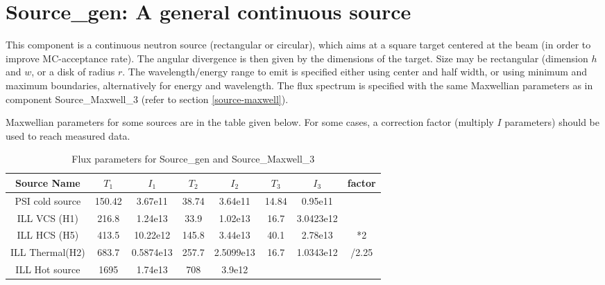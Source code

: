 \section{Source\_gen: A general continuous source}
\label{source-gen}


This component is a continuous neutron source (rectangular or circular), which aims at
a square target centered at the beam (in order to improve MC-acceptance
rate). The angular divergence is then given by the dimensions of the
target. Size may be rectangular (dimension $h$ and $w$, or a disk of radius $r$. The wavelength/energy range to emit is specified either using center and half width, or using minimum and maximum boundaries, alternatively for energy and wavelength.
The flux spectrum is specified with the same Maxwellian parameters as in component Source\_Maxwell\_3 (refer to section \ref{source-maxwell}).

Maxwellian parameters for some sources are in the table given below. For some cases, a correction factor (multiply $I$ parameters) should be used to reach measured data.

\begin{table}
  \begin{center}
  {\let\my=\\
    \begin{tabular}{cccccccc}
    \hline
    Source Name & $T_1$ & $I_1$ & $T_2$ & $I_2$ & $T_3$ & $I_3$ & factor \\
    \hline
    PSI cold source & 150.42 & 3.67e11   & 38.74 & 3.64e11    & 14.84& 0.95e11    &\\
    ILL VCS (H1)    & 216.8  & 1.24e13  & 33.9  & 1.02e13   & 16.7 & 3.0423e12 &\\
    ILL HCS (H5)    & 413.5  & 10.22e12  & 145.8 & 3.44e13    & 40.1 & 2.78e13    & *2\\
    ILL Thermal(H2) & 683.7  & 0.5874e13& 257.7 & 2.5099e13 & 16.7 & 1.0343e12 & /2.25\\
    ILL Hot source  & 1695   & 1.74e13   & 708   & 3.9e12     &      &            &\\
    \end{tabular}
    \caption{Flux parameters for Source\_gen and Source\_Maxwell\_3}
    \label{t:source-params}
  }
  \end{center}
\end{table}